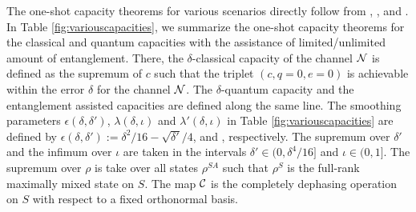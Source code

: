 \documentclass[journal]{IEEEtran}
\begin{document}
The one-shot capacity theorems for various scenarios directly follow from , ,  and .
In Table \ref{fig:variouscapacities}, we summarize the one-shot capacity theorems for the classical and quantum capacities with the assistance of limited/unlimited amount of entanglement.
There, the $\delta$-classical capacity of the channel ${\mathcal N}$ is defined as the supremum of $c$ such that the triplet $(c,q=0,e=0)$ is achievable within the error $\delta$ for the channel ${\mathcal N}$.
The $\delta$-quantum capacity and the entanglement assisted capacities are defined along the same line.
The smoothing parameters $\epsilon(\delta,\delta')$, $\lambda(\delta,\iota)$ and $\lambda'(\delta,\iota)$ in Table \ref{fig:variouscapacities} are defined by $\epsilon(\delta,\delta'):=\delta^2/16-\sqrt{\delta'}/4$,  and , respectively. The supremum over $\delta'$ and the infimum over $\iota$ are taken in the intervals $\delta'\in(0,\delta^4/16]$ and $\iota\in(0,1]$. The supremum over $\rho$ is take over all states $\rho^{SA}$ such that $\rho^S$ is the full-rank maximally mixed state on $S$. The map ${\mathcal C}$ is the completely dephasing operation on $S$ with respect to a fixed orthonormal basis.
\end{document}
